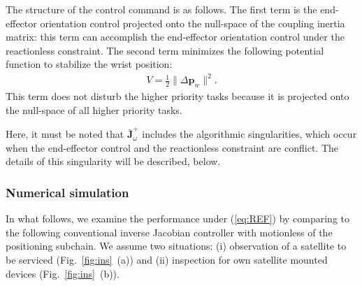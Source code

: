 \documentclass[preprint,12pt]{elsarticle}
\def\fig#1{{Fig.~\ref{fig:#1}}}
\def\eq#1{{(\ref{eq:#1})}}
\begin{document}
The structure of the control command is as follows.
The first term is the end-effector orientation control projected onto the null-space of
the coupling inertia matrix:
this term can accomplish the end-effector orientation control under the reactionless constraint.
The second term minimizes the following potential function to stabilize the wrist position:
%
\begin{align}
 V = \frac{1}{2}\|\Delta\bm{p}_{w}\|^{2}.
\end{align}
%
This term does not disturb the higher priority tasks because it is projected
onto the null-space of all higher priority tasks.

Here, it must be noted that $\bar{\bm{J}}_{\omega}^{+}$ includes the algorithmic singularities,
which occur when the end-effector control and the reactionless constraint are conflict.
The details of this singularity will be described, below.

\subsubsection{Numerical simulation}
\label{sec:SIMULATION}
In what follows,
we examine the performance under \eq{REF} by comparing to
the following conventional inverse Jacobian controller with motionless of the positioning subchain.
We assume two situations:
(i) observation of a satellite to be serviced (\fig{ins}~(a)) and
(ii) inspection for own satellite mounted devices (\fig{ins}~(b)).
\end{document}

